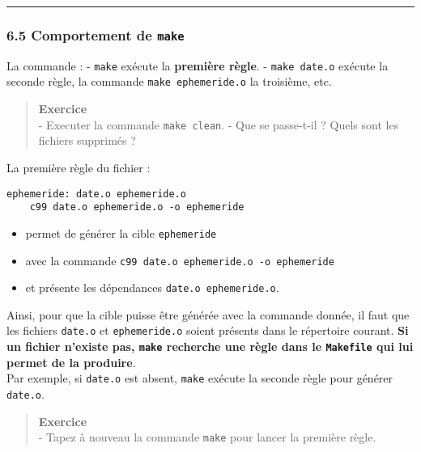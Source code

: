 \documentclass[11pt]{article}
\providecommand{\tightlist}{%
      \setlength{\itemsep}{0pt}\setlength{\parskip}{0pt}}
\begin{document}
    \begin{center}\rule{0.5\linewidth}{\linethickness}\end{center}

    \subsubsection{\texorpdfstring{6.5 Comportement de
\texttt{make}}{6.5 Comportement de make}}\label{comportement-de-make}

La commande : - \texttt{make} exécute la \textbf{première règle}. -
\texttt{make\ date.o} exécute la seconde règle, la commande
\texttt{make\ ephemeride.o} la troisième, etc.

\begin{quote}
\textbf{Exercice}\\
- Executer la commande \texttt{make\ clean}. - Que se passe-t-il ? Quels
sont les fichiers supprimés ?
\end{quote}

La première règle du fichier :

\begin{verbatim}
ephemeride: date.o ephemeride.o
    c99 date.o ephemeride.o -o ephemeride
\end{verbatim}

\begin{itemize}
\tightlist
\item
  permet de générer la cible \texttt{ephemeride}
\item
  avec la commande \texttt{c99\ date.o\ ephemeride.o\ -o\ ephemeride}
\item
  et présente les dépendances \texttt{date.o\ ephemeride.o}.
\end{itemize}

Ainsi, pour que la cible puisse être générée avec la commande donnée, il
faut que les fichiers \texttt{date.o} et \texttt{ephemeride.o} soient
présents dans le répertoire courant. \textbf{Si un fichier n'existe pas,
\texttt{make} recherche une règle dans le \texttt{Makefile} qui lui
permet de la produire}.\\
Par exemple, si \texttt{date.o} est absent, \texttt{make} exécute la
seconde règle pour générer \texttt{date.o}.

\begin{quote}
\textbf{Exercice}\\
- Tapez à nouveau la commande \texttt{make} pour lancer la première
règle.
\end{quote}
\end{document}
